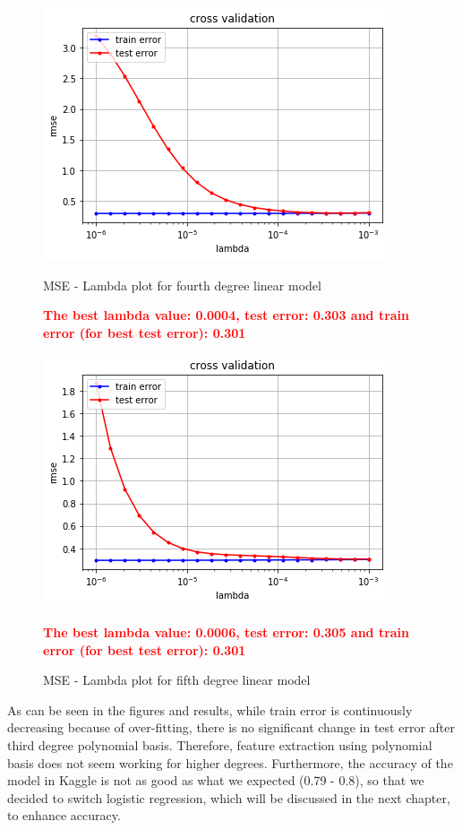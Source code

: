 \documentclass[10pt,conference,compsocconf]{IEEEtran}
\begin{document}
\begin{center}
\begin{figure}
\includegraphics[scale=0.4]{linear_4}
\centering
\caption{MSE - Lambda plot for fourth degree linear model}
\textbf{\textcolor{red}{The best lambda value: 0.0004, test error: 0.303 and train error (for best test error): 0.301}}
\vspace{5ex}

\includegraphics[scale=0.4]{linear_5}
\centering
\caption{MSE - Lambda plot for fifth degree linear model}
\textbf{\textcolor{red}{The best lambda value: 0.0006, test error: 0.305 and train error (for best test error): 0.301}}
\end{figure}
\end{center}
\newpage
As can be seen in the figures and results, while train error is continuously decreasing because of over-fitting, there is no significant change in test error after third degree polynomial basis. Therefore, feature extraction using polynomial basis does not seem working for higher degrees. Furthermore, the accuracy of the model in Kaggle is not as good as what we expected (0.79 - 0.8), so that we decided to switch logistic regression, which will be discussed in the next chapter, to enhance accuracy.
\end{document}
